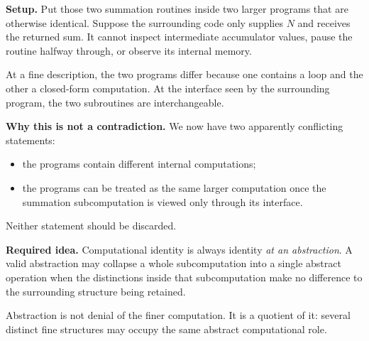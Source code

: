 \documentclass[11pt,a4paper]{article}
\newcounter{thought}
\newenvironment{thoughtbox}[1]{%
  \refstepcounter{thought}%
  \begin{tcolorbox}[
    enhanced,breakable,
    colback=white,colframe=navy,boxrule=0.85pt,
    arc=1.7mm,left=2.8mm,right=2.8mm,top=2.2mm,bottom=2.0mm,
    borderline west={2.2pt}{0pt}{blue},
    title={\large\bfseries Thought experiment \thethought: #1},
    fonttitle=\bfseries,coltitle=navy,
    attach boxed title to top left={xshift=2mm,yshift=-2mm},
    boxed title style={colback=sky,colframe=blue,boxrule=0.55pt,arc=1.2mm},
    before skip=9pt,after skip=10pt
  ]
}{\end{tcolorbox}}
\newcommand{\scene}{\medskip\textbf{Setup.} }
\begin{document}
\begin{thoughtbox}{The subroutine disappears inside a larger program}
\scene Put those two summation routines inside two larger programs that are otherwise identical. Suppose the surrounding code only supplies $N$ and receives the returned sum. It cannot inspect intermediate accumulator values, pause the routine halfway through, or observe its internal memory.

At a fine description, the two programs differ because one contains a loop and the other a closed-form computation. At the interface seen by the surrounding program, the two subroutines are interchangeable.

\medskip\textbf{Why this is not a contradiction.} We now have two apparently conflicting statements:
\begin{itemize}
  \item the programs contain different internal computations;
  \item the programs can be treated as the same larger computation once the summation subcomputation is viewed only through its interface.
\end{itemize}
Neither statement should be discarded.

\medskip\textbf{Required idea.} Computational identity is always identity \emph{at an abstraction}. A valid abstraction may collapse a whole subcomputation into a single abstract operation when the distinctions inside that subcomputation make no difference to the surrounding structure being retained.

\begin{conceptbox}
Abstraction is not denial of the finer computation. It is a quotient of it: several distinct fine structures may occupy the same abstract computational role.
\end{conceptbox}
\end{thoughtbox}
\end{document}
